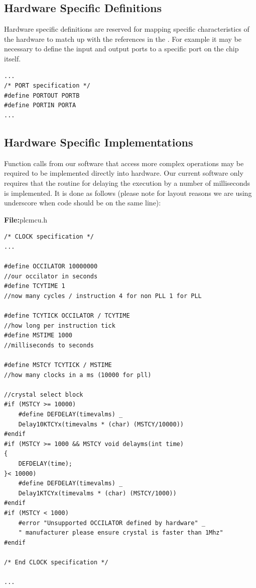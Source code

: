 \subsection{Hardware Specific Definitions}

Hardware specific definitions are reserved for mapping specific characteristics 
of the hardware to match up with the references in the . 
For example it may be necessary to define the input and output ports to a specific port on the chip itself.



\begin{lstlisting}[frame=single]
...
/* PORT specification */
#define PORTOUT PORTB
#define PORTIN PORTA
...
\end{lstlisting}



\subsection{Hardware Specific Implementations}

Function calls from our software that access more complex operations 
may be required to be implemented directly into hardware. Our current 
software only requires that the routine for delaying the execution by a 
number of milliseconds is implemented. It is done as follows (please 
note for layout reasons we are using underscore when code should be 
on the same line):

\textbf{File:}plcmcu.h



\begin{lstlisting}[frame=single]
/* CLOCK specification */
...

#define OCCILATOR 10000000 
//our occilator in seconds
#define TCYTIME 1 
//now many cycles / instruction 4 for non PLL 1 for PLL 

#define TCYTICK OCCILATOR / TCYTIME 
//how long per instruction tick
#define MSTIME 1000 
//milliseconds to seconds

#define MSTCY TCYTICK / MSTIME 
//how many clocks in a ms (10000 for pll)

//crystal select block
#if (MSTCY >= 10000)
	#define DEFDELAY(timevalms) _
	Delay10KTCYx(timevalms * (char) (MSTCY/10000))
#endif
#if (MSTCY >= 1000 && MSTCY void delayms(int time)
{
	DEFDELAY(time);
}< 10000)
	#define DEFDELAY(timevalms) _ 
	Delay1KTCYx(timevalms * (char) (MSTCY/1000))
#endif
#if (MSTCY < 1000)
	#error "Unsupported OCCILATOR defined by hardware" _ 
	" manufacturer please ensure crystal is faster than 1Mhz"
#endif

/* End CLOCK specification */

...
\end{lstlisting}



